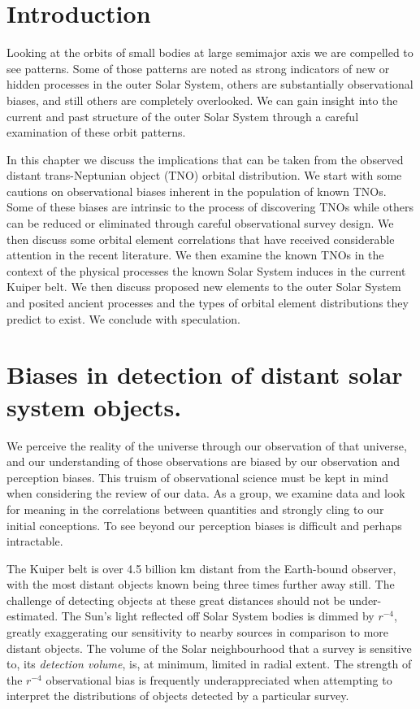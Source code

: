 \documentclass{aastex62}
\begin{document}
\section{Introduction}

Looking at the orbits of small bodies at large semimajor axis we are compelled to see
patterns. Some of those patterns are noted as strong
indicators of new or hidden processes in the outer Solar System,
others are substantially observational biases, and still others are
completely overlooked. We can gain insight into the current and past
structure of the outer Solar System through a careful examination of
these orbit patterns.

In this chapter we discuss the implications that can be taken from the observed distant trans-Neptunian object (TNO) orbital distribution.  We start with some cautions on observational biases inherent in the population of known TNOs.  Some of these biases are intrinsic to the process of discovering TNOs while others can be reduced or eliminated through careful observational survey design. We then discuss some orbital element correlations that have received considerable attention in the recent literature. We then examine the known TNOs in the context of the physical processes the known Solar System induces in the current Kuiper belt.  We then discuss proposed new elements to the outer Solar System and posited ancient processes and the types of orbital element distributions they predict to exist.  We conclude with speculation.

\section{Biases in detection of distant solar system objects.}

We perceive the reality of the universe through our observation of that universe, and our understanding of those observations are biased by our observation and perception biases. This truism of observational science must be kept in mind when considering the review of our data. As a group, we examine data and look for meaning in the correlations between quantities and strongly cling to our initial conceptions.  To see beyond our perception biases is difficult and perhaps intractable. 

The Kuiper belt is over 4.5 billion km distant from the Earth-bound observer, with the most distant objects known being three times further away still.  The challenge of detecting objects at these great distances should not be under-estimated.  The Sun's light reflected off Solar System bodies is dimmed by $r^{-4}$, greatly exaggerating our sensitivity to nearby sources in comparison to more distant objects.  The volume of the Solar neighbourhood that a survey is sensitive to, its {\it detection volume},  is, at minimum, limited in radial extent. The strength of the $r^{-4}$ observational bias is frequently underappreciated when attempting to interpret the distributions of objects detected by a particular survey.
\end{document}
